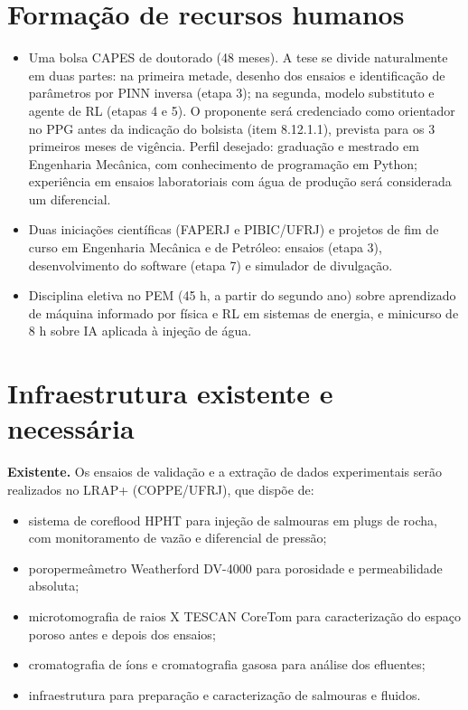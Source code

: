 \documentclass[11pt,a4paper]{article}
\newcommand{\itemedital}[1]{}
\begin{document}
\section{Formação de recursos humanos}\itemedital{2.16 XVIII; critério 3}
\begin{itemize}
  \item Uma bolsa CAPES de doutorado (48 meses). A tese se divide naturalmente em duas
        partes: na primeira metade, desenho dos ensaios e identificação de parâmetros por
        PINN inversa (etapa 3); na segunda, modelo substituto e agente de RL (etapas 4 e 5).
        O proponente será credenciado como orientador no PPG antes da indicação do
        bolsista (item 8.12.1.1), prevista para os 3 primeiros meses de vigência.
        Perfil desejado: graduação e mestrado em Engenharia Mecânica, com conhecimento de
        programação em Python; experiência em ensaios laboratoriais com água de produção
        será considerada um diferencial.
  \item Duas iniciações científicas (FAPERJ e PIBIC/UFRJ) e projetos de fim de curso em
        Engenharia Mecânica e de Petróleo: ensaios (etapa 3), desenvolvimento do software
        (etapa 7) e simulador de divulgação.
  \item Disciplina eletiva no PEM (45 h, a partir do segundo ano) sobre aprendizado de
        máquina informado por física e RL em sistemas de energia, e minicurso de 8 h sobre
        IA aplicada à injeção de água.
\end{itemize}

\section{Infraestrutura existente e necessária}\label{sec:infra}\itemedital{2.16 XIX; Anexo 1 G, II.II-h}

\textbf{Existente.} Os ensaios de validação e a extração de dados experimentais serão
realizados no LRAP+ (COPPE/UFRJ), que dispõe de:
\begin{itemize}
  \item sistema de coreflood HPHT para injeção de salmouras em plugs de rocha, com
        monitoramento de vazão e diferencial de pressão;
  \item poropermeâmetro Weatherford DV-4000 para porosidade e permeabilidade absoluta;
  \item microtomografia de raios X TESCAN CoreTom para caracterização do espaço poroso
        antes e depois dos ensaios;
  \item cromatografia de íons e cromatografia gasosa para análise dos efluentes;
  \item infraestrutura para preparação e caracterização de salmouras e fluidos.
\end{itemize}
\end{document}
